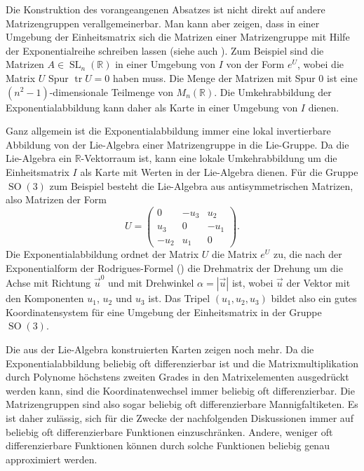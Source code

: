 Die Konstruktion des vorangeangenen Absatzes ist nicht direkt
auf andere Matrizengruppen verallgemeinerbar.
Man kann aber zeigen, dass in einer Umgebung der Einheitsmatrix
sich die Matrizen einer Matrizengruppe mit Hilfe der Exponentialreihe
schreiben lassen (siehe auch \cite[Abschnitt~9.4.4]{buch:linalg}).
Zum Beispiel sind die Matrizen $A\in \operatorname{SL}_n(\mathbb{R})$
in einer Umgebung von $I$ von der Form
\(
e^U
\),
wobei
die  Matrix $U$ Spur $\operatorname{tr}{U}=0$ haben muss.
Die Menge der Matrizen mit Spur $0$ ist eine $(n^2-1)$-dimensionale
Teilmenge von $M_{n}(\mathbb{R})$.
Die Umkehrabbildung der Exponentialabbildung kann daher als Karte
in einer Umgebung von $I$ dienen.

Ganz allgemein ist die Exponentialabbildung immer eine lokal
invertierbare Abbildung von der Lie-Algebra einer Matrizengruppe
in die Lie-Gruppe.
Da die Lie-Algebra ein $\mathbb{R}$-Vektorraum ist, kann eine
lokale Umkehrabbildung um die Einheitsmatrix $I$ als Karte mit
Werten in der Lie-Algebra dienen.
Für die Gruppe $\operatorname{SO}(3)$ zum Beispiel besteht die
Lie-Algebra aus antisymmetrischen Matrizen, also Matrizen
der Form
\[
U
=
\begin{pmatrix}
  0  & -u_3 &  u_2 \\
 u_3 &   0  & -u_1 \\
-u_2 &  u_1 &   0
\end{pmatrix}.
\]
Die Exponentialabbildung ordnet der Matrix $U$ die Matrix $e^U$
zu, die nach der Exponentialform der Rodrigues-Formel 
(\cite[p.~483]{buch:linalg}) die Drehmatrix der Drehung um die
Achse mit Richtung $\vec{u}^0$ und mit Drehwinkel $\alpha=|\vec{u}|$
ist, wobei $\vec{u}$ der Vektor mit den Komponenten $u_1$, $u_2$ und
$u_3$ ist.
Das Tripel $(u_1,u_2,u_3)$ bildet also ein gutes Koordinatensystem
für eine Umgebung der Einheitsmatrix in der Gruppe $\operatorname{SO}(3)$.

Die aus der Lie-Algebra konstruierten Karten zeigen noch mehr.
Da die Exponentialabbildung beliebig oft differenzierbar ist und die
Matrixmultiplikation durch Polynome höchstens zweiten Grades in
den Matrixelementen ausgedrückt werden kann, sind die Koordinatenwechsel
immer beliebig oft differenzierbar.
Die Matrizengruppen sind also sogar beliebig oft differenzierbare
Mannigfaltiketen. 
Es ist daher zulässig, sich für die Zwecke der nachfolgenden Diskussionen
immer auf beliebig oft differenzierbare Funktionen einzuschränken.
Andere, weniger oft differenzierbare Funktionen können durch
solche Funktionen beliebig genau approximiert werden.

